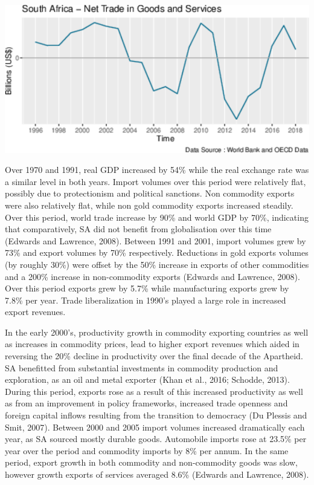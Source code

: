 \documentclass[11pt,preprint, authoryear]{elsarticle}
\let\origfigure\figure
\let\endorigfigure\endfigure
\renewenvironment{figure}[1][2] {
    \expandafter\origfigure\expandafter[H]
} {
    \endorigfigure
}
\numberwithin{equation}{section}
\numberwithin{figure}{section}
\numberwithin{table}{section}
\begin{document}
\begin{figure}[H]

{\centering \includegraphics{tradedynamics1_files/figure-latex/Graph10-1} 

}

\caption{South Africa's Net Trade in Goods and Services \label{Graph10}}\label{fig:Graph10}
\end{figure}

Over 1970 and 1991, real GDP increased by 54\% while the real exchange
rate was a similar level in both years. Import volumes over this period
were relatively flat, possibly due to protectionism and political
sanctions. Non commodity exports were also relatively flat, while non
gold commodity exports increased steadily. Over this period, world trade
increase by 90\% and world GDP by 70\%, indicating that comparatively,
SA did not benefit from globalisation over this time (Edwards and
Lawrence, 2008). Between 1991 and 2001, import volumes grew by 73\% and
export volumes by 70\% respectively. Reductions in gold exports volumes
(by roughly 30\%) were offset by the 50\% increase in exports of other
commodities and a 200\% increase in non-commodity exports (Edwards and
Lawrence, 2008). Over this period exports grew by 5.7\% while
manufacturing exports grew by 7.8\% per year. Trade liberalization in
1990's played a large role in increased export revenues.

In the early 2000's, productivity growth in commodity exporting
countries as well as increases in commodity prices, lead to higher
export revenues which aided in reversing the 20\% decline in
productivity over the final decade of the Apartheid. SA benefitted from
substantial investments in commodity production and exploration, as an
oil and metal exporter (Khan et al., 2016; Schodde, 2013). During this
period, exports rose as a result of this increased productivity as well
as from an improvement in policy frameworks, increased trade openness
and foreign capital inflows resulting from the transition to democracy
(Du Plessis and Smit, 2007). Between 2000 and 2005 import volumes
increased dramatically each year, as SA sourced mostly durable goods.
Automobile imports rose at 23.5\% per year over the period and commodity
imports by 8\% per annum. In the same period, export growth in both
commodity and non-commodity goods was slow, however growth exports of
services averaged 8.6\% (Edwards and Lawrence, 2008).
\end{document}
